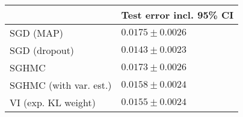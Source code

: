 \begin{tabular}{ll}
\toprule
{} & Test error incl. 95\% CI \\
\midrule
SGD (MAP)              &      $0.0175 \pm 0.0026$ \\
SGD (dropout)          &      $0.0143 \pm 0.0023$ \\
SGHMC                  &      $0.0173 \pm 0.0026$ \\
SGHMC (with var. est.) &      $0.0158 \pm 0.0024$ \\
VI (exp. KL weight)    &      $0.0155 \pm 0.0024$ \\
\bottomrule
\end{tabular}
